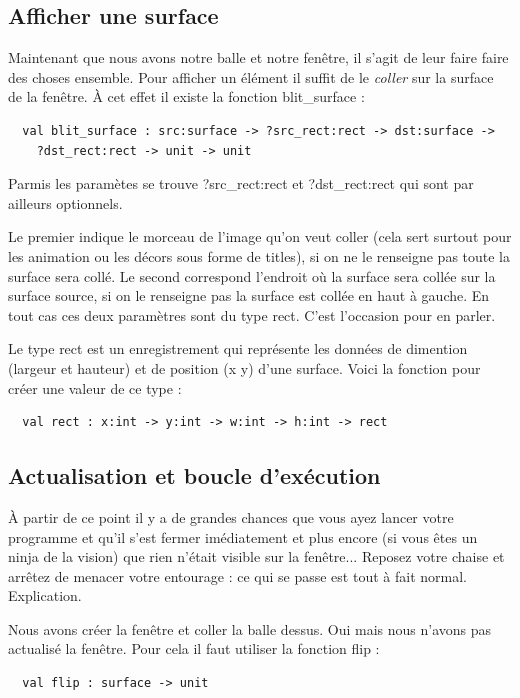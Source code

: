 \documentclass[a4paper]{article}
\begin{document}
\subsection{Afficher une surface}
Maintenant que nous avons notre balle et notre fenêtre, il s'agit de leur faire faire des choses ensemble. Pour afficher un élément il suffit de le \textit{coller} sur la surface de la fenêtre. À cet effet il existe la fonction blit\_surface :

\begin{lstlisting}
  val blit_surface : src:surface -> ?src_rect:rect -> dst:surface -> 
    ?dst_rect:rect -> unit -> unit
\end{lstlisting}

Parmis les paramètes se trouve ?src\_rect:rect et ?dst\_rect:rect qui sont par ailleurs optionnels.\par
Le premier indique le morceau de l'image qu'on veut coller (cela sert surtout pour les animation ou les décors sous forme de titles), si on ne le renseigne pas toute la surface sera collé. Le second correspond l'endroit où la surface sera collée sur la surface source, si on le renseigne pas la surface est collée en haut à gauche. En tout cas ces deux paramètres sont du type rect. C'est l'occasion pour en parler.\bigskip

Le type rect est un enregistrement qui représente les données de dimention (largeur et hauteur) et de position (x y) d'une surface. Voici la fonction pour créer une valeur de ce type :

\begin{lstlisting}
  val rect : x:int -> y:int -> w:int -> h:int -> rect
\end{lstlisting}

\subsection{Actualisation et boucle d'exécution}
À partir de ce point il y a de grandes chances que vous ayez lancer votre programme et qu'il s'est fermer imédiatement et plus encore (si vous êtes un ninja de la vision) que rien n'était visible sur la fenêtre... Reposez votre chaise et arrêtez de menacer votre entourage : ce qui se passe est tout à fait normal. Explication.\par
Nous avons créer la fenêtre et coller la balle dessus. Oui mais nous n'avons pas actualisé la fenêtre. Pour cela il faut utiliser la fonction flip :

\begin{lstlisting}
  val flip : surface -> unit
\end{lstlisting}
\end{document}
